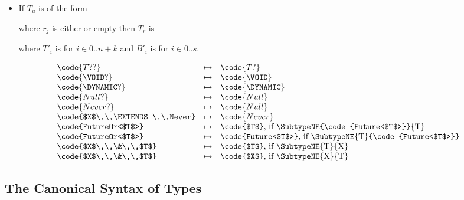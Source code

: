 \documentclass[makeidx]{article}
\begin{document}
{\begin{itemize}
  \noindent
  then $T_r$ is

  \noindent
  where $T'\!_i$ is  for $i \in 0 .. n+k$
  and $B'\!_i$ is  for $i \in 1 .. s$.
\item If $T_u$ is of the form

  \noindent
  where $r_j$ is either \REQUIRED{} or empty
  then $T_r$ is
  \noindent

  \noindent
  where $T'\!_i$ is  for $i \in 0 .. n+k$
  and $B'\!_i$ is  for $i \in 0 .. s$.
\end{itemize}


\begin{displaymath}
  \begin{array}{l@{\quad\mapsto\quad}l}
    \code{T??} & \code{T?}\\
    \code{\VOID?} & \code{\VOID}\\
    \code{\DYNAMIC?} & \code{\DYNAMIC}\\
    \code{Null?} & \code{Null}\\
    \code{Never?} & \code{Null}\\
    \code{$X$\,\,\EXTENDS\,\,Never} & \code{Never}\\
    \code{FutureOr<$T$>} & \code{$T$}%
    \mbox{, if \SubtypeNE{\code{Future<$T$>}}{T}}\\
    \code{FutureOr<$T$>} & \code{Future<$T$>}%
    \mbox{, if \SubtypeNE{T}{\code{Future<$T$>}}}\\
    \code{$X$\,\,\&\,\,$T$} & \code{$T$}\mbox{, if \SubtypeNE{T}{X}}\\
    \code{$X$\,\,\&\,\,$T$} & \code{$X$}\mbox{, if \SubtypeNE{X}{T}}
  \end{array}
\end{displaymath}


\subsection{The Canonical Syntax of Types}

}
\end{document}
